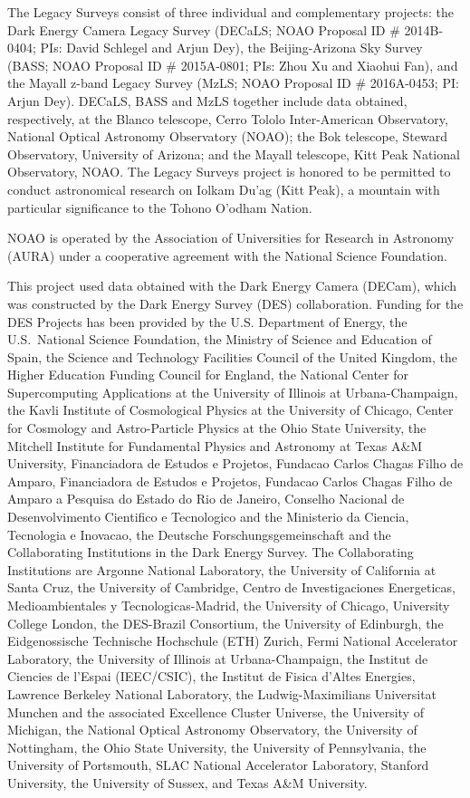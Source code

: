 \documentclass[a4paper,usenatbib]{mnras}
\begin{document}
The Legacy Surveys consist of three individual and complementary projects: the Dark Energy Camera Legacy Survey (DECaLS; NOAO Proposal ID \# 2014B-0404; PIs: David Schlegel and Arjun Dey), the Beijing-Arizona Sky Survey (BASS; NOAO Proposal ID \# 2015A-0801; PIs: Zhou Xu and Xiaohui Fan), and the Mayall z-band Legacy Survey (MzLS; NOAO Proposal ID \# 2016A-0453; PI: Arjun Dey). DECaLS, BASS and MzLS together include data obtained, respectively, at the Blanco telescope, Cerro Tololo Inter-American Observatory, National Optical Astronomy Observatory (NOAO); the Bok telescope, Steward Observatory, University of Arizona; and the Mayall telescope, Kitt Peak National Observatory, NOAO. The Legacy Surveys project is honored to be permitted to conduct astronomical research on Iolkam Du'ag (Kitt Peak), a mountain with particular significance to the Tohono O'odham Nation.

NOAO is operated by the Association of Universities for Research in Astronomy (AURA) under a cooperative agreement with the National Science Foundation.

This project used data obtained with the Dark Energy Camera (DECam), which was constructed by the Dark Energy Survey (DES) collaboration. Funding for the DES Projects has been provided by the U.S. Department of Energy, the U.S.\ National Science Foundation, the Ministry of Science and Education of Spain, the Science and Technology Facilities Council of the United Kingdom, the Higher Education Funding Council for England, the National Center for Supercomputing Applications at the University of Illinois at Urbana-Champaign, the Kavli Institute of Cosmological Physics at the University of Chicago, Center for Cosmology and Astro-Particle Physics at the Ohio State University, the Mitchell Institute for Fundamental Physics and Astronomy at Texas A\&M University, Financiadora de Estudos e Projetos, Fundacao Carlos Chagas Filho de Amparo, Financiadora de Estudos e Projetos, Fundacao Carlos Chagas Filho de Amparo a Pesquisa do Estado do Rio de Janeiro, Conselho Nacional de Desenvolvimento Cientifico e Tecnologico and the Ministerio da Ciencia, Tecnologia e Inovacao, the Deutsche Forschungsgemeinschaft and the Collaborating Institutions in the Dark Energy Survey. The Collaborating Institutions are Argonne National Laboratory, the University of California at Santa Cruz, the University of Cambridge, Centro de Investigaciones Energeticas, Medioambientales y Tecnologicas-Madrid, the University of Chicago, University College London, the DES-Brazil Consortium, the University of Edinburgh, the Eidgenossische Technische Hochschule (ETH) Zurich, Fermi National Accelerator Laboratory, the University of Illinois at Urbana-Champaign, the Institut de Ciencies de l'Espai (IEEC/CSIC), the Institut de Fisica d'Altes Energies, Lawrence Berkeley National Laboratory, the Ludwig-Maximilians Universitat Munchen and the associated Excellence Cluster Universe, the University of Michigan, the National Optical Astronomy Observatory, the University of Nottingham, the Ohio State University, the University of Pennsylvania, the University of Portsmouth, SLAC National Accelerator Laboratory, Stanford University, the University of Sussex, and Texas A\&M University.
\end{document}
